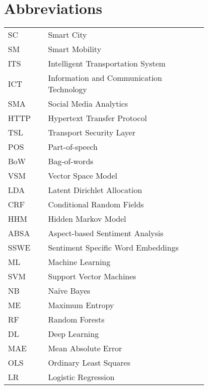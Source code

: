 \chapter*{Abbreviations}

\begin{flushleft}
\begin{tabular}{l p{0.8\linewidth}}
SC      & Smart City \\
SM		& Smart Mobility \\
ITS      & Intelligent Transportation System \\
ICT		& Information and Communication Technology \\
SMA		& Social Media Analytics \\
HTTP	& Hypertext Transfer Protocol \\
TSL		& Transport Security Layer \\
POS		& Part-of-speech \\
BoW		& Bag-of-words \\
VSM		& Vector Space Model \\
LDA		& Latent Dirichlet Allocation \\
CRF		& Conditional Random Fields \\
HHM		& Hidden Markov Model \\
ABSA	& Aspect-based Sentiment Analysis \\
SSWE	& Sentiment Specific Word Embeddings \\
ML		& Machine Learning \\
SVM		& Support Vector Machines \\
NB 		& Naïve Bayes \\
ME		& Maximum Entropy \\
RF		& Random Forests \\
DL		& Deep Learning \\
MAE		& Mean Absolute Error \\
OLS		& Ordinary Least Squares \\
LR		& Logistic Regression
\end{tabular}
\end{flushleft}

